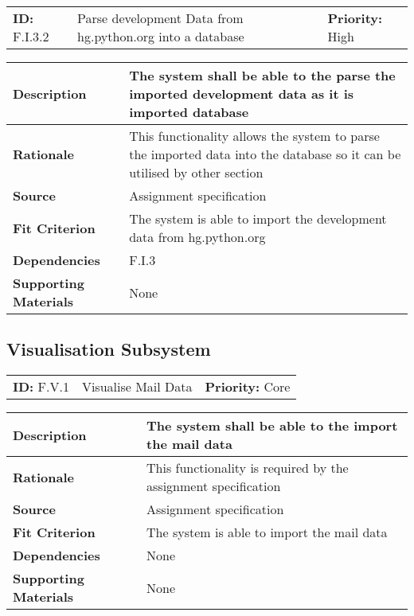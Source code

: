 \begin{table}[H]
    \begin{tabularx}{\textwidth}{| l | X | l |}
        \hline
        \textbf{ID:} F.I.3.2 & Parse development Data from hg.python.org into a database & \textbf{Priority:} High \\
    \end{tabularx}
    \begin{tabularx}{\textwidth}{| l | X |}
        \hline
        \textbf{Description} & The system shall be able to the parse the imported development data as it is imported database\\ \hline
        \textbf{Rationale} & This functionality allows the system to parse the imported data into the database so it can be utilised by other section\\ \hline
        \textbf{Source} & Assignment specification\\ \hline
        \textbf{Fit Criterion} & The system is able to import the development data from hg.python.org\\ \hline
        \textbf{Dependencies} & F.I.3 \\ \hline
        \textbf{Supporting Materials} & None \\ \hline
    \end{tabularx}
\end{table}



\subsection{Visualisation Subsystem}

\begin{table}[H]
    \begin{tabularx}{\textwidth}{| l | X | l |}
        \hline
        \textbf{ID:} F.V.1 & Visualise Mail Data & \textbf{Priority:} Core \\
    \end{tabularx}
    \begin{tabularx}{\textwidth}{| l | X |}
        \hline
        \textbf{Description} & The system shall be able to the import the mail data \\ \hline
        \textbf{Rationale} & This functionality is required by the assignment specification\\ \hline
        \textbf{Source} & Assignment specification\\ \hline
        \textbf{Fit Criterion} & The system is able to import the mail data\\ \hline
        \textbf{Dependencies} & None \\ \hline
        \textbf{Supporting Materials} & None \\ \hline
    \end{tabularx}
\end{table}


